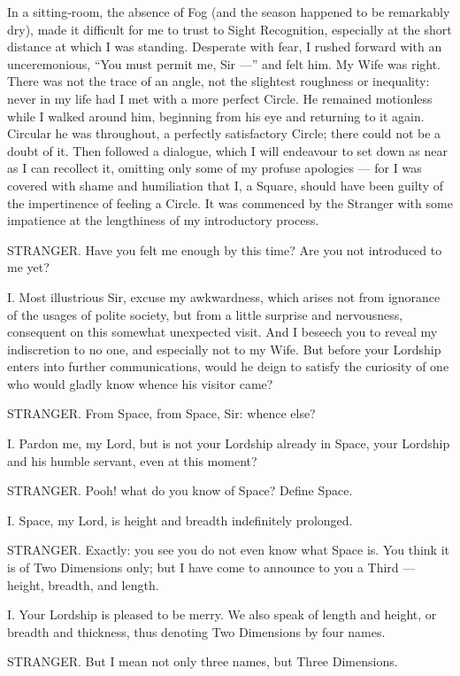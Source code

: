 \documentclass[12pt, a4paper, twoside]{memoir}
\begin{document}
In a sitting-room, the absence of Fog (and the season happened to be
remarkably dry), made it difficult for me to trust to Sight Recognition,
especially at the short distance at which I was standing. Desperate with fear,
I rushed forward with an unceremonious, ``You must permit me, Sir ---'' and felt
him. My Wife was right. There was not the trace of an angle, not the slightest
roughness or inequality: never in my life had I met with a more perfect
Circle. He remained motionless while I walked around him, beginning from his
eye and returning to it again. Circular he was throughout, a perfectly
satisfactory Circle; there could not be a doubt of it. Then followed a
dialogue, which I will endeavour to set down as near as I can recollect it,
omitting only some of my profuse apologies --- for I was covered with shame and
humiliation that I, a Square, should have been guilty of the impertinence of
feeling a Circle. It was commenced by the Stranger with some impatience at the
lengthiness of my introductory process.

STRANGER. Have you felt me enough by this time? Are you not introduced to me
yet?

I. Most illustrious Sir, excuse my awkwardness, which arises not from
ignorance of the usages of polite society, but from a little surprise and
nervousness, consequent on this somewhat unexpected visit. And I beseech you
to reveal my indiscretion to no one, and especially not to my Wife. But before
your Lordship enters into further communications, would he deign to satisfy
the curiosity of one who would gladly know whence his visitor came?

STRANGER. From Space, from Space, Sir: whence else?

I. Pardon me, my Lord, but is not your Lordship already in Space, your
Lordship and his humble servant, even at this moment?

STRANGER. Pooh! what do you know of Space? Define Space.

I. Space, my Lord, is height and breadth indefinitely prolonged.

STRANGER. Exactly: you see you do not even know what Space is. You think it is
of Two Dimensions only; but I have come to announce to you a Third --- height,
breadth, and length.

I. Your Lordship is pleased to be merry. We also speak of length and height,
or breadth and thickness, thus denoting Two Dimensions by four names.

STRANGER. But I mean not only three names, but Three Dimensions.
\end{document}
